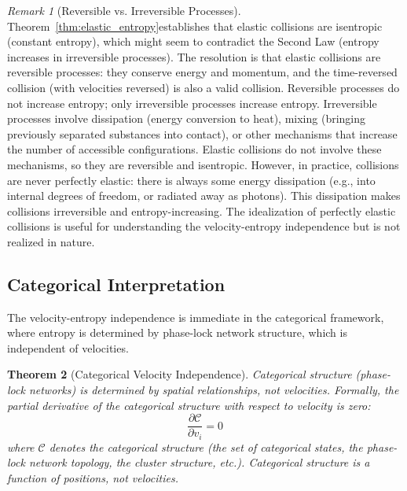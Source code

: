 \documentclass[12pt,a4paper]{article}
\newtheorem{theorem}{Theorem}[section]
\theoremstyle{definition}
\theoremstyle{remark}
\newtheorem{remark}[theorem]{Remark}
\begin{document}
\begin{remark}[Reversible vs. Irreversible Processes]
\label{rem:reversible_irreversible}
Theorem~\ref{thm:elastic_entropy}establishes that elastic collisions are isentropic (constant entropy), which might seem to contradict the Second Law (entropy increases in irreversible processes). The resolution is that elastic collisions are reversible processes: they conserve energy and momentum, and the time-reversed collision (with velocities reversed) is also a valid collision. Reversible processes do not increase entropy; only irreversible processes increase entropy. Irreversible processes involve dissipation (energy conversion to heat), mixing (bringing previously separated substances into contact), or other mechanisms that increase the number of accessible configurations. Elastic collisions do not involve these mechanisms, so they are reversible and isentropic. However, in practice, collisions are never perfectly elastic: there is always some energy dissipation (e.g., into internal degrees of freedom, or radiated away as photons). This dissipation makes collisions irreversible and entropy-increasing. The idealization of perfectly elastic collisions is useful for understanding the velocity-entropy independence but is not realized in nature.
\end{remark}

\subsection{Categorical Interpretation}

The velocity-entropy independence is immediate in the categorical framework, where entropy is determined by phase-lock network structure, which is independent of velocities.

\begin{theorem}[Categorical Velocity Independence]
\label{thm:categorical_velocity}
Categorical structure (phase-lock networks) is determined by spatial relationships, not velocities. Formally, the partial derivative of the categorical structure with respect to velocity is zero:
\begin{equation}
\frac{\partial \mathcal{C}}{\partial v_i} = 0
\label{eq:categorical_velocity_independent}
\end{equation}
where $\mathcal{C}$ denotes the categorical structure (the set of categorical states, the phase-lock network topology, the cluster structure, etc.). Categorical structure is a function of positions, not velocities.
\end{theorem}
\end{document}

